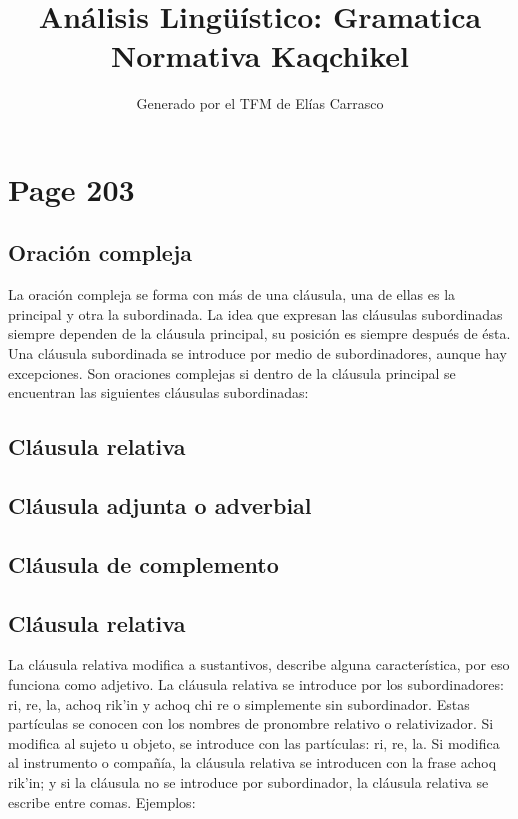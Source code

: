 \documentclass{article}%
\title{Análisis Lingüístico: Gramatica Normativa Kaqchikel}%
\author{Generado por el TFM de Elías Carrasco}%
\begin{document}
%
\normalsize%
\maketitle%
\section{Page 203}%
\label{sec:Page203}%

%
\subsection{Oración compleja}%
\label{subsec:Oracincompleja}%

%
La oración compleja se forma con más de una cláusula, una de ellas es la principal y %
otra la subordinada. La idea que expresan las cláusulas subordinadas siempre dependen %
de la cláusula principal, su posición es siempre después de ésta. Una cláusula subordinada %
se introduce por medio de subordinadores, aunque hay excepciones. Son oraciones %
complejas si dentro de la cláusula principal se encuentran las siguientes cláusulas %
subordinadas: %
\subsection{Cláusula relativa}%
\label{subsec:Clusularelativa}%

%
\subsection{Cláusula adjunta o adverbial}%
\label{subsec:Clusulaadjuntaoadverbial}%

%
\subsection{Cláusula de complemento}%
\label{subsec:Clusuladecomplemento}%

%
\subsection{Cláusula relativa}%
\label{subsec:Clusularelativa}%

%
La cláusula relativa modifica a sustantivos, describe alguna característica, por eso %
funciona como adjetivo. La cláusula relativa se introduce por los subordinadores: ri, %
re, la, achoq rik'in y achoq chi re o simplemente sin subordinador. Estas partículas se %
conocen con los nombres de pronombre relativo o relativizador. Si modifica al sujeto u %
objeto, se introduce con las partículas: ri, re, la. Si modifica al instrumento o compañía, %
la cláusula relativa se introducen con la frase achoq rik'in; y si la cláusula no se %
introduce por subordinador, la cláusula relativa se escribe entre comas. Ejemplos: %
\end{document}
